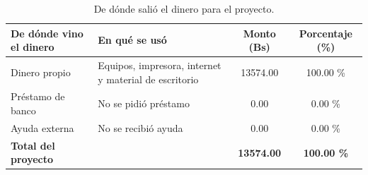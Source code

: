 \begin{table}[htbp]
    \centering
    \caption{De dónde salió el dinero para el proyecto.}
    \label{tab:financiamiento}
    \renewcommand{\arraystretch}{1.45}
    \begin{tabularx}{\textwidth}{L L C C}
        \toprule
        \textbf{De dónde vino el dinero} & \textbf{En qué se usó} & \textbf{Monto (Bs)} & \textbf{Porcentaje (\%)} \\
        \midrule
        Dinero propio & Equipos, impresora, internet y material de escritorio & 13574.00 & 100.00 \% \\
        Préstamo de banco & No se pidió préstamo & 0.00 & 0.00 \% \\
        Ayuda externa & No se recibió ayuda & 0.00 & 0.00 \% \\
        \midrule
        \textbf{Total del proyecto} & & \textbf{13574.00} & \textbf{100.00 \%} \\
        \bottomrule
    \end{tabularx}
\end{table}
